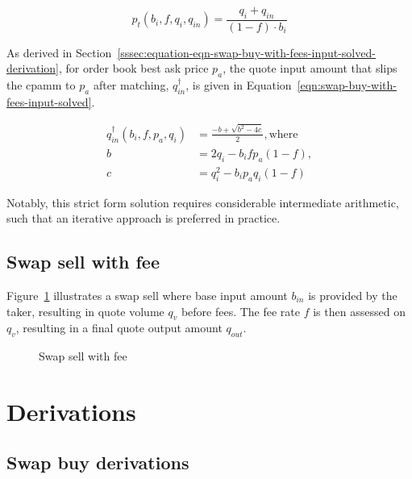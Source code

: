 \documentclass[table, twocolumn]{article}
\begin{document}
\begin{equation}\label{eqn:swap-taker-execution-price-buy-solved}
  p_t (b_i, f, q_i, q_{in}) = \frac{q_i + q_{in}}{(1 - f) \cdot b_i}
\end{equation}

As derived in
Section~\ref{sssec:equation-eqn-swap-buy-with-fees-input-solved-derivation}, for order
book best ask price $p_a$, the quote input amount that slips the \gls*{cpamm} to
$p_a$ after matching, $q_{in}^{\dagger}$, is given in
Equation~\ref{eqn:swap-buy-with-fees-input-solved}.

\begin{equation}\label{eqn:swap-buy-with-fees-input-solved}
  \begin{aligned}
    q_{in}^{\dagger} (b_i, f, p_a, q_i) &= \frac{-b + \sqrt{b^2 - 4c}}{2},
    \text{where} \\
    b &= 2 q_i - b_i f p_a(1-f), \\
    c &= q_i^2 - b_i p_a q_i (1 - f)
    \end{aligned} \nonumber
\end{equation}

Notably, this strict form solution requires considerable intermediate arithmetic, such
that an iterative approach is preferred in practice.

\subsection{Swap sell with fee}\label{ssec:swap-sell-with-fee}

Figure~\ref{fig:swap-sell-with-fee} illustrates a swap sell where base input amount
$b_{in}$ is provided by the taker, resulting in quote volume $q_v$ before fees. The fee
rate $f$ is then assessed on $q_v$, resulting in a final quote output amount $q_{out}$.

\begin{figure}[!htb]
	\centering
	
	\caption{Swap sell with fee}\label{fig:swap-sell-with-fee}
\end{figure}

\section{Derivations}\label{sec:derivations}

\subsection{Swap buy derivations}\label{ssec:swap-buy-derivations}
\end{document}
